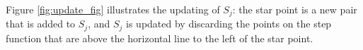 Figure \ref{fig:update_fig} illustrates the updating of $S_j$: the star point is a new pair that is added
to $S_j$, and $S_j$ is updated by discarding the points on the step function that are above the horizontal line to the left  of the star point.


